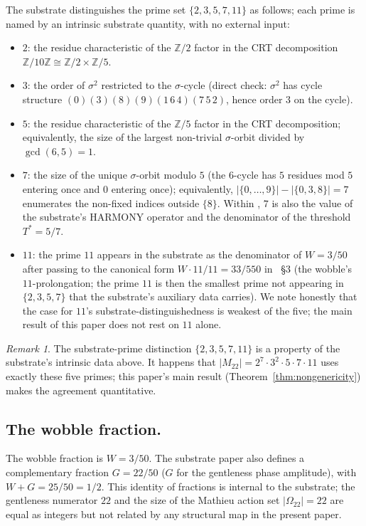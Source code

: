 \documentclass[11pt,reqno]{amsart}
\theoremstyle{plain}
\theoremstyle{definition}
\theoremstyle{remark}
\newtheorem*{remark}{Remark}
\newcommand{\Z}{\mathbb{Z}}
\newcommand{\Mtwentytwo}{M_{22}}
\newcommand{\sig}{\sigma}
\begin{document}
The substrate distinguishes the prime set
$\{2, 3, 5, 7, 11\}$ as follows; each prime is named by an
intrinsic substrate quantity, with no external input:
\begin{itemize}\setlength\itemsep{2pt}
\item $2$: the residue characteristic of the $\Z/2$ factor in the
CRT decomposition $\Z/10\Z \cong \Z/2 \times \Z/5$.
\item $3$: the order of $\sig^{2}$ restricted to the $\sig$-cycle
(direct check: $\sig^{2}$ has cycle structure $(0)(3)(8)(9)(1\,6\,4)
(7\,5\,2)$, hence order $3$ on the cycle).
\item $5$: the residue characteristic of the $\Z/5$ factor in the
CRT decomposition; equivalently, the size of the largest non-trivial
$\sig$-orbit divided by $\gcd(6, 5) = 1$.
\item $7$: the size of the unique $\sig$-orbit modulo $5$ (the
$6$-cycle has $5$ residues mod $5$ entering once and $0$ entering
once); equivalently, $|\{0, \ldots, 9\}| - |\{0, 3, 8\}| = 7$ enumerates
the non-fixed indices outside $\{8\}$. Within
\cite{SandersGishFourCore}, $7$ is also the value of the
substrate's HARMONY operator and the denominator of the threshold
$T^{*} = 5/7$.
\item $11$: the prime $11$ appears in the substrate as the
denominator of $W = 3/50$ after passing to the canonical form
$W \cdot 11/11 = 33/550$ in
\cite{SandersGishFourCore}~\S$3$ (the wobble's $11$-prolongation; the
prime $11$ is then the smallest prime not appearing in
$\{2, 3, 5, 7\}$ that the substrate's auxiliary data carries). We
note honestly that the case for $11$'s substrate-distinguishedness is
weakest of the five; the main result of this paper does not rest on
$11$ alone.
\end{itemize}

\begin{remark}
The substrate-prime distinction $\{2, 3, 5, 7, 11\}$ is a property
of the substrate's intrinsic data above. It happens that
$|\Mtwentytwo| = 2^{7} \cdot 3^{2} \cdot 5 \cdot 7 \cdot 11$ uses
exactly these five primes; this paper's main result
(Theorem~\ref{thm:nongenericity}) makes the agreement quantitative.
\end{remark}

\subsection{The wobble fraction.}
The wobble fraction is $W = 3/50$. The substrate paper
\cite{SandersGishFourCore} also defines a complementary fraction
$G = 22/50$ ($G$ for the gentleness phase amplitude), with
$W + G = 25/50 = 1/2$. This identity of fractions is internal to
the substrate; the gentleness numerator $22$ and the size of the
Mathieu action set $|\Omega_{22}| = 22$ are equal as integers but not
related by any structural map in the present paper.
\end{document}
